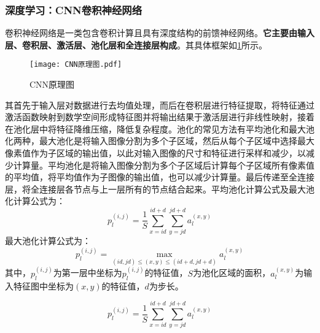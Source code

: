 \documentclass{MathorCupmodeling}
\begin{document}
	\subsubsection{深度学习：CNN卷积神经网络}
	卷积神经网络是一类包含卷积计算且具有深度结构的前馈神经网络。\textbf{它主要由输入层、卷积层、激活层、池化层和全连接层构成}\textcolor{blue}{\cite{李莎}}。其具体框架如\textcolor{blue}{\cref{fig:CNN原理图}}所示。
	\begin{figure}[H]
		\centering
		\texttt{[image: CNN原理图.pdf]}
		\caption{CNN原理图}
		\label{fig:CNN原理图}
	\end{figure}

	其首先于输入层对数据进行去均值处理，而后在卷积层进行特征提取，将特征通过激活函数映射到数学空间形成特征图并将输出结果于激活层进行非线性映射\textcolor{blue}{\cite{孟琪琳}}，接着在池化层中将特征降维压缩，降低复杂程度。池化的常见方法有平均池化和最大池化两种，最大池化是将输入图像分割为多个子区域，然后从每个子区域中选择最大像素值作为子区域的输出值，以此对输入图像的尺寸和特征进行采样和减少，以减少计算量。平均池化是将输入图像分割为多个子区域后计算每个子区域所有像素值的平均值，将平均值作为子图像的输出值，也可以减少计算量\textcolor{blue}{\cite{刘幸倩}}。最后传递至全连接层，将全连接层各节点与上一层所有的节点结合起来。平均池化计算公式及最大池化计算公式为：
	\begin{equation}
		p_{l}^{\left( i,j \right)}=\frac{1}{S}\sum_{x=id}^{id+d}{\sum_{y=jd}^{jd+d}{a_{l}^{\left( x,y \right)}}}
	\end{equation}
	最大池化计算公式为：
	\begin{equation}
		p_{l}^{\left( i,j \right)}=\underset{\left( id,jd \right) \leqslant \left( x,y \right) \leqslant \left( id+d,jd+d \right)}{\max}a_{l}^{\left( x,y \right)}
	\end{equation}
	其中，$p_{l}^{\left( i,j \right)}$为第一层中坐标为$p_{l}^{\left( i,j \right)}$的特征值，$S$为池化区域的面积，$a_{l}^{\left( x,y \right)}$为输入特征图中坐标为$\left( x,y \right)$的特征值，$d$为步长。

	\begin{equation}
		p_{l}^{\left( i,j \right)}=\frac{1}{S}\sum_{x=id}^{id+d}{\sum_{y=jd}^{jd+d}{a_{l}^{\left( x,y \right)}}}
	\end{equation}
\end{document}
